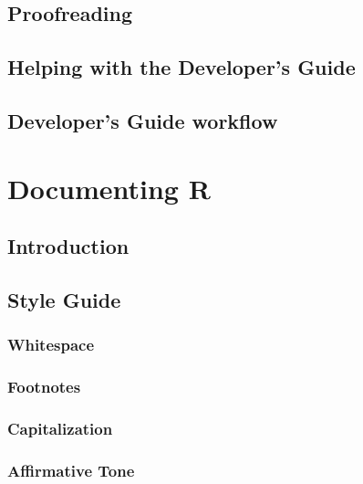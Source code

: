 \documentclass[]{book}
\begin{document}
\hypertarget{proofreading}{%
\section{Proofreading}\label{proofreading}}

\hypertarget{helping-with-the-developers-guide}{%
\section{Helping with the Developer's Guide}\label{helping-with-the-developers-guide}}

\hypertarget{developers-guide-workflow}{%
\section{Developer's Guide workflow}\label{developers-guide-workflow}}

\hypertarget{documenting-r}{%
\chapter{Documenting R}\label{documenting-r}}

\hypertarget{introduction-2}{%
\section{Introduction}\label{introduction-2}}

\hypertarget{style-guide}{%
\section{Style Guide}\label{style-guide}}

\hypertarget{whitespace}{%
\subsection{Whitespace}\label{whitespace}}

\hypertarget{footnotes}{%
\subsection{Footnotes}\label{footnotes}}

\hypertarget{capitalization}{%
\subsection{Capitalization}\label{capitalization}}

\hypertarget{affirmative-tone}{%
\subsection{Affirmative Tone}\label{affirmative-tone}}
\end{document}
